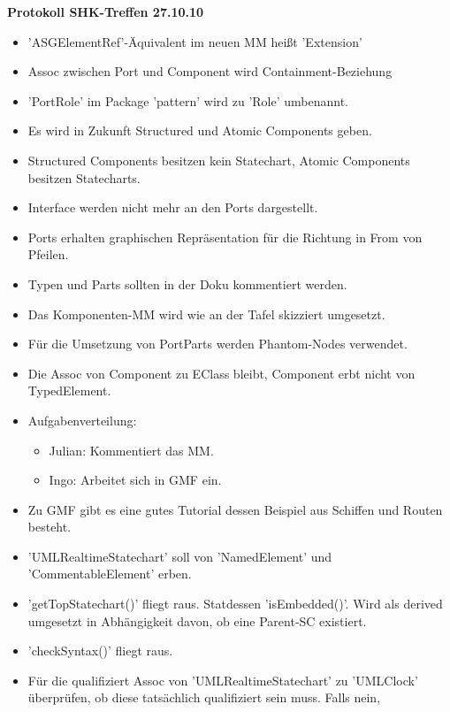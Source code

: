 \documentclass[11pt,a4paper]{article}
\begin{document}
\begin{center}

\textbf{\huge Protokoll SHK-Treffen 27.10.10}\\[0.9cm]

\end{center}

\begin{itemize}
\item  'ASGElementRef'-Äquivalent im neuen MM heißt 'Extension'
\item  Assoc zwischen Port und Component wird Containment-Beziehung
\item  'PortRole' im Package 'pattern' wird zu 'Role' umbenannt.
\item  Es wird in Zukunft Structured und Atomic Components geben.
\item  Structured Components besitzen kein Statechart, Atomic Components
besitzen Statecharts.
\item  Interface werden nicht mehr an den Ports dargestellt.
\item  Ports erhalten graphischen Repräsentation für die Richtung in From von
 Pfeilen.
\item  Typen und Parts sollten in der Doku kommentiert werden.
\item  Das Komponenten-MM wird wie an der Tafel skizziert umgesetzt.
\item  Für die Umsetzung von PortParts werden Phantom-Nodes verwendet.
\item  Die Assoc von Component zu EClass bleibt, Component erbt nicht von
TypedElement.
\item  Aufgabenverteilung:
\begin{itemize}
\item Julian: Kommentiert das MM.
\item Ingo: Arbeitet sich in GMF ein.
\end{itemize}
\item  Zu GMF gibt es eine gutes Tutorial dessen Beispiel aus Schiffen und
Routen besteht.
\item  'UMLRealtimeStatechart' soll von 'NamedElement' und
'CommentableElement' erben.
\item  'getTopStatechart()' fliegt raus. Statdessen 'isEmbedded()'. Wird als
derived umgesetzt in Abhängigkeit davon, ob eine Parent-SC existiert.
\item  'checkSyntax()' fliegt raus.
\item  Für die qualifiziert Assoc von 'UMLRealtimeStatechart' zu 'UMLClock'
überprüfen, ob diese tatsächlich qualifiziert sein muss. Falls nein,

\end{itemize}
\end{document}
